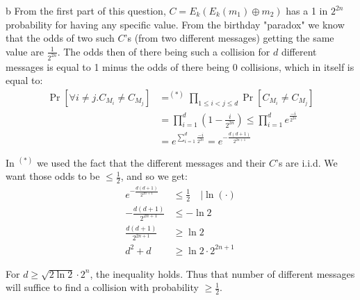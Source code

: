 \documentclass{article}
\begin{document}
\begin{paragraph}
    b From the first part of this question, $C = E_k(E_k(m_1) \oplus m_2)$ has a 1 in $2^{2n}$ probability for having any specific value. From the birthday "paradox" we know that the odds of two such $C$'s (from two different messages) getting the same value are $\frac{1}{2^{2n}}$. The odds then of there being such a collision for $d$ different messages is equal to 1 minus the odds of there being 0 collisions, which in itself is equal to:
    \begin{align*}
        \Pr[\forall i \neq j. C_{M_i} \neq C_{M_j}] &=^{(*)} \prod\limits_{1 \leq i < j \leq d}\Pr[C_{M_i} \neq C_{M_j}]\\
        &= \prod\limits_{i = 1}^d \left(1 - \frac{i}{2^{2n}}\right) \leq \prod\limits_{i = 1}^d e^{\frac{-i}{2^{2n}}}\\
        &= e^{\sum\limits_{i = 1}^d \frac{-i}{2^{2n}}} = e^{-\frac{d(d + 1)}{2^{2n+1}}}
    \end{align*}
    
    In $^{(*)}$ we used the fact that the different messages and their $C$'s are i.i.d. We want those odds to be $\leq \frac{1}{2}$, and so we get:
    \begin{align*}
        e^{-\frac{d(d + 1)}{2^{2n+1}}} &\leq \frac{1}{2} \quad |\ln(\cdot)\\
        -\frac{d(d + 1)}{2^{2n+1}} &\leq -\ln2\\
        \frac{d(d + 1)}{2^{2n+1}} &\geq \ln2\\
        d^2 + d &\geq \ln2 \cdot 2^{2n+1}
    \end{align*}
    
    For $d \geq \sqrt{2\ln2} \cdot 2^n$, the inequality holds. Thus that number of different messages will suffice to find a collision with probability $\geq \frac{1}{2}$.
\end{paragraph}
\end{document}
